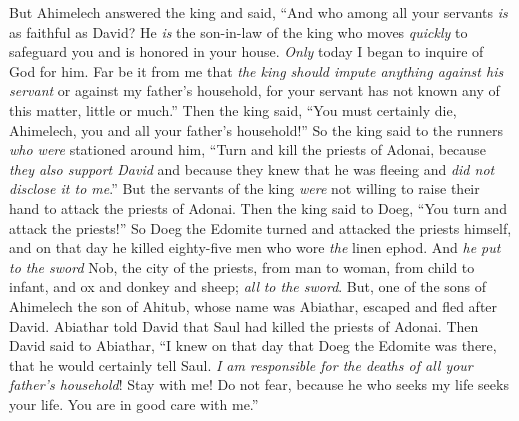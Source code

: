 \begin{biblechapter}
\verse But Ahimelech answered the king and said, “And who among all your servants \textit{is} as faithful as David? He \textit{is} the son-in-law of the king who moves \textit{quickly} to safeguard you and is honored in your house.
\verse \textit{Only} today I began to inquire of God for him. Far be it from me that \textit{the king should impute anything against his servant} or against my father’s household, for your servant has not known any of this matter, little or much.”
\verse Then the king said, “You must certainly die, Ahimelech, you and all your father’s household!”
\verse So the king said to the runners \textit{who were} stationed around him, “Turn and kill the priests of Adonai, because \textit{they also support David} and because they knew that he was fleeing and \textit{did not disclose it to me}.” But the servants of the king \textit{were} not willing to raise their hand to attack the priests of Adonai.
\verse Then the king said to Doeg, “You turn and attack the priests!” So Doeg the Edomite turned and attacked the priests himself, and on that day he killed eighty-five men who wore \textit{the} linen ephod.
\verse And \textit{he put to the sword} Nob, the city of the priests, from man to woman, from child to infant, and ox and donkey and sheep; \textit{all} \textit{to the sword}.
\verse But, one of the sons of Ahimelech the son of Ahitub, whose name was Abiathar, escaped and fled after David.
\verse Abiathar told David that Saul had killed the priests of Adonai.
\verse Then David said to Abiathar, “I knew on that day that Doeg the Edomite was there, that he would certainly tell Saul. \textit{I am responsible for the deaths of all your father’s household}!
\verse Stay with me! Do not fear, because he who seeks my life seeks your life. You are in good care with me.”
\end{biblechapter}

